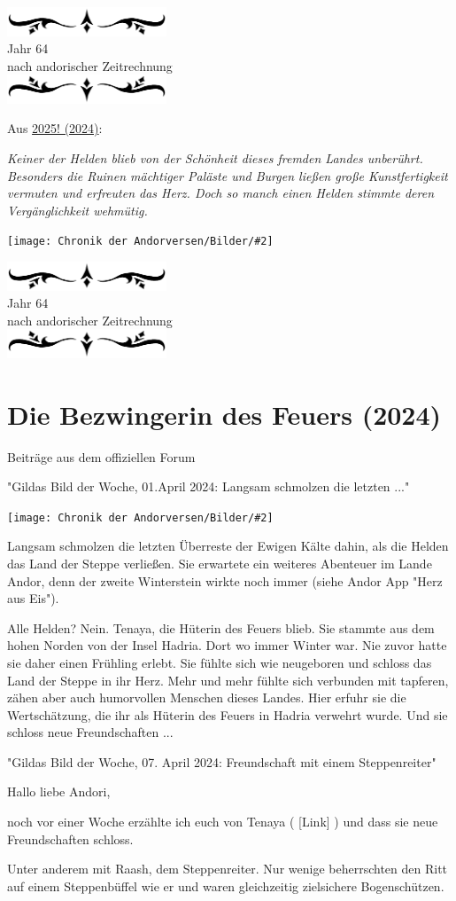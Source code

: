 \documentclass[10pt, a4paper, oneside]{book}
\newcommand{\fillbreak}{\vspace*{\fill}\columnbreak}
\newcommand{\storytext}[1]{%
    \section{#1}%
    \label{Storytext: #1}%
}
\newcommand{\refstorytext}[1]{\hyperref[Storytext: #1]{#1}}
\newcommand{\bildmitts}[2][height=0.32\textwidth,width=0.48\textwidth,keepaspectratio]{%
    \begin{center}
        \texttt{[image: Chronik der Andorversen/Bilder/\#2]}
    \end{center}
}
\newcommand{\az}[1]{%
    \begin{center}
        \includegraphics[width=180px]{Chronik der Andorversen/verzierung1.png}\\
        {\Huge #1} \\
        {nach andorischer Zeitrechnung}\\
        \includegraphics[width=180px]{Chronik der Andorversen/verzierung2.png}
    \end{center}
    \extramarks{}{#1 a.Z.}
}
\begin{document}
\begin{multicols}{2}
\begin{chapterbox}
    \az{Jahr 64}

    \begin{center}
        Aus \refstorytext{2025! (2024)}:
    \end{center}

    \textit{Keiner der Helden blieb von der Schönheit dieses fremden Landes unberührt. Besonders die Ruinen mächtiger Paläste und Burgen ließen große Kunstfertigkeit vermuten und erfreuten das Herz. Doch so manch einen Helden stimmte deren Vergänglichkeit wehmütig.}

    \bildmitts[width=\textwidth]{Andor Das Ferne Land Banner.jpeg}


\end{chapterbox}



\fillbreak
\az{Jahr 64}
\storytext{Die Bezwingerin des Feuers (2024)}

\begin{center}
    Beiträge aus dem offiziellen Forum

    "Gildas Bild der Woche, 01.April 2024: Langsam schmolzen die letzten ..."
\end{center}

\bildmitts{Die Bezwingerin des Feuers 1.jpeg}

Langsam schmolzen die letzten Überreste der Ewigen Kälte dahin, als die Helden das Land der Steppe verließen. Sie erwartete ein weiteres Abenteuer im Lande Andor, denn der zweite Winterstein wirkte noch immer (siehe Andor App "Herz aus Eis").

Alle Helden? Nein. Tenaya, die Hüterin des Feuers blieb. Sie stammte aus dem hohen Norden von der Insel Hadria. Dort wo immer Winter war. Nie zuvor hatte sie daher einen Frühling erlebt. Sie fühlte sich wie neugeboren und schloss das Land der Steppe in ihr Herz. Mehr und mehr fühlte sich verbunden mit tapferen, zähen aber auch humorvollen Menschen dieses Landes. Hier erfuhr sie die Wertschätzung, die ihr als Hüterin des Feuers in Hadria verwehrt wurde. Und sie schloss neue Freundschaften ...


\begin{center}
    "Gildas Bild der Woche, 07. April 2024: Freundschaft mit einem Steppenreiter"
\end{center}

Hallo liebe Andori,

noch vor einer Woche erzählte ich euch von Tenaya ( [Link] ) und dass sie neue Freundschaften schloss.

Unter anderem mit Raash, dem Steppenreiter. Nur wenige beherrschten den Ritt auf einem Steppenbüffel wie er und waren gleichzeitig zielsichere Bogenschützen.


\end{multicols}
\end{document}
